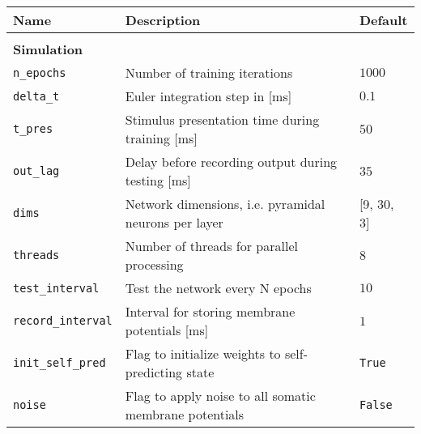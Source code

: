 \begin{table}
  \fontsize{12pt}{12pt}\selectfont
  \begin{center}
    \begin{tabular}{p{}p{}p{}}    \hline
      \textbf{Name}                & \textbf{Description}                                                        &
      \textbf{Default}
      \\
      \hline

      \\\textbf{Simulation} \\\hline
      \texttt{n\_epochs}           & Number of training iterations                                               &
      $1000$                                                                                                             \\
      \texttt{delta\_t}            & Euler integration step in [ms]                                              & $0.1$
      \\
      \texttt{t\_pres}             & Stimulus presentation time during training [ms]                             & $50$
      \\
      \texttt{out\_lag}            & Delay before recording output during testing [ms]                           & $35$
      \\
      \texttt{dims}                & Network dimensions, i.e. pyramidal neurons per layer                        & [9,
      30, 3]                                                                                                             \\
      \texttt{threads}             & Number of threads for parallel processing                                   & $8$
      \\
      \texttt{test\_interval}      & Test the network every N epochs                                             & $10$
      \\
      \texttt{record\_interval}    & Interval for storing membrane potentials [ms]                               & $1$
      \\
      \texttt{init\_self\_pred}    & Flag to initialize weights to self-predicting state                         &
      \texttt{True}
      \\
      \texttt{noise}               & Flag to apply noise to all somatic membrane potentials                      &
      \texttt{False}                                                                                                     \\

\end{tabular}
\end{center}
\end{table}
